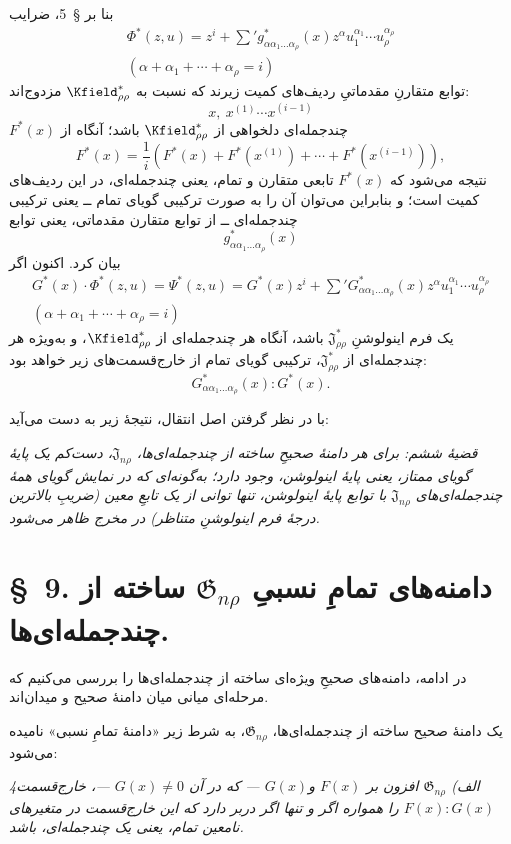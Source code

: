 \documentclass[11pt]{article}
\providecommand{\Jdom}{\mathfrak{J}}
\providecommand{\Gdom}{\mathfrak{G}}
\begin{document}
بنا بر \S\ 5، ضرایب
\[
\begin{gathered}
\Phi^*(z,u)=z^i+\sum{}'g^*_{\alpha\alpha_1\ldots\alpha_\rho}(x)z^\alpha u_1^{\alpha_1}\cdots u_\rho^{\alpha_\rho}\\
(\alpha+\alpha_1+\cdots+\alpha_\rho=i)
\end{gathered}
\]
توابع متقارنِ مقدماتیِ ردیف‌های کمیت زیرند که نسبت به $\Kfield^*_{\rho\rho}$ مزدوج‌اند:
\[
x,\ x^{(1)}\cdots x^{(i-1)}
\]
$F^*(x)$ چندجمله‌ای دلخواهی از $\Kfield^*_{\rho\rho}$ باشد؛ آنگاه از
\[
F^*(x)=\frac1i\left(F^*(x)+F^*(x^{(1)})+\cdots+F^*(x^{(i-1)})\right),
\]
نتیجه می‌شود که $F^*(x)$ تابعی متقارن و تمام، یعنی چندجمله‌ای، در این ردیف‌های کمیت است؛ و بنابراین می‌توان آن را به صورت ترکیبی گویای تمام ــ یعنی ترکیبی چندجمله‌ای ــ از توابع متقارن مقدماتی، یعنی توابع
\[
g^*_{\alpha\alpha_1\ldots\alpha_\rho}(x)
\]
بیان کرد. اکنون اگر
\[
\begin{gathered}
G^*(x)\cdot\Phi^*(z,u)=\Psi^*(z,u)=G^*(x)z^i+
\sum{}'G^*_{\alpha\alpha_1\ldots\alpha_\rho}(x)z^\alpha u_1^{\alpha_1}\cdots u_\rho^{\alpha_\rho}\\
(\alpha+\alpha_1+\cdots+\alpha_\rho=i)
\end{gathered}
\]
یک فرم اینولوشنِ $\Jdom^*_{\rho\rho}$ باشد، آنگاه هر چندجمله‌ای از $\Kfield^*_{\rho\rho}$، و به‌ویژه هر چندجمله‌ای از $\Jdom^*_{\rho\rho}$، ترکیبی گویای تمام از خارج‌قسمت‌های زیر خواهد بود:
\[
G^*_{\alpha\alpha_1\ldots\alpha_\rho}(x):G^*(x).
\]

با در نظر گرفتن اصل انتقال، نتیجهٔ زیر به دست می‌آید:

\emph{قضیهٔ ششم: برای هر دامنهٔ صحیحِ ساخته از چندجمله‌ای‌ها، $\Jdom_{n\rho}$، دست‌کم یک پایهٔ گویای ممتاز، یعنی پایهٔ اینولوشن، وجود دارد؛ به‌گونه‌ای که در نمایش گویای همهٔ چندجمله‌ای‌های $\Jdom_{n\rho}$ با توابع پایهٔ اینولوشن، تنها توانی از یک تابعِ معین (ضریبِ بالاترین درجهٔ فرم اینولوشنِ متناظر) در مخرج ظاهر می‌شود.}

\section*{\S\ 9. دامنه‌های تمامِ نسبیِ $\Gdom_{n\rho}$ ساخته از چندجمله‌ای‌ها.}

در ادامه، دامنه‌های صحیحِ ویژه‌ای ساخته از چندجمله‌ای‌ها را بررسی می‌کنیم که مرحله‌ای میانی میان دامنهٔ صحیح و میدان‌اند.

یک دامنهٔ صحیح ساخته از چندجمله‌ای‌ها، $\Gdom_{n\rho}$، به شرط زیر «دامنهٔ تمامِ نسبی» نامیده می‌شود:

\emph{4الف) $\Gdom_{n\rho}$ افزون بر $F(x)$ و$G(x)$ --- که در آن $G(x)\ne0$ ---، خارج‌قسمت $F(x):G(x)$ را همواره اگر و تنها اگر دربر دارد که این خارج‌قسمت در متغیرهای نامعین تمام، یعنی یک چندجمله‌ای، باشد.}
\end{document}
